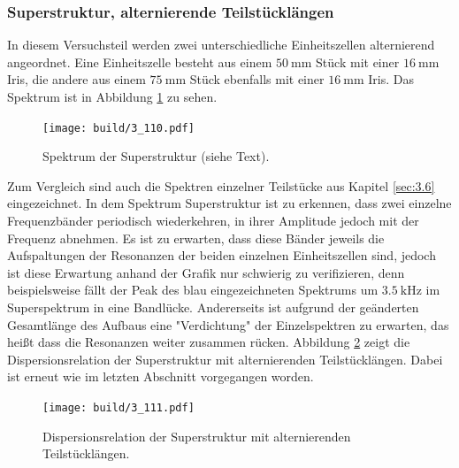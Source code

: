 \subsubsection{Superstruktur, alternierende Teilstücklängen}
In diesem Versuchsteil werden zwei unterschiedliche Einheitszellen alternierend angeordnet. Eine Einheitszelle besteht aus einem $\SI{50}{\milli\meter}$ Stück mit einer $\SI{16}{\milli\meter}$ Iris, die andere aus einem $\SI{75}{\milli\meter}$ Stück ebenfalls mit einer $\SI{16}{\milli\meter}$ Iris. Das Spektrum ist in Abbildung \ref{fig:3_110} zu sehen.
\begin{figure}
  \centering  \texttt{[image: build/3\_110.pdf]}  \caption{Spektrum der Superstruktur (siehe Text).} \label{fig:3_110}
\end{figure}
Zum Vergleich sind auch die Spektren einzelner Teilstücke aus Kapitel \ref{sec:3.6} eingezeichnet. In dem Spektrum Superstruktur ist zu erkennen, dass zwei einzelne Frequenzbänder periodisch wiederkehren, in ihrer Amplitude jedoch mit der Frequenz abnehmen. Es ist zu erwarten, dass diese Bänder jeweils die Aufspaltungen der Resonanzen der beiden einzelnen Einheitszellen sind, jedoch ist diese Erwartung anhand der Grafik nur schwierig zu verifizieren, denn beispielsweise fällt der Peak des blau eingezeichneten Spektrums um $\SI{3.5}{\kilo\hertz}$ im Superspektrum in eine Bandlücke. Andererseits ist aufgrund der geänderten Gesamtlänge des Aufbaus eine "Verdichtung" der Einzelspektren zu erwarten, das heißt dass die Resonanzen weiter zusammen rücken. %
Abbildung \ref{fig:3_111} zeigt die Dispersionsrelation der Superstruktur mit alternierenden Teilstücklängen. Dabei ist erneut wie im letzten Abschnitt vorgegangen worden.
\begin{figure}
  \centering  \texttt{[image: build/3\_111.pdf]}  \caption{Dispersionsrelation der Superstruktur mit alternierenden Teilstücklängen.} \label{fig:3_111}
\end{figure}

